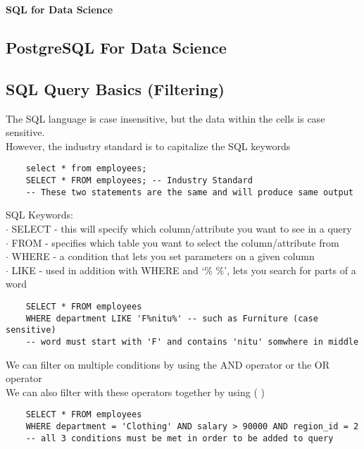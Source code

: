\documentclass[11pt, a4paper]{article}
\begin{document}
	\begin{titlepage}
		\begin{center} \Huge \textbf{SQL for Data Science} \end{center}
		\tableofcontents
		\newpage
	\end{titlepage}
	\begin{spacing}{1.1}
	\section{PostgreSQL For Data Science}
	\subsection{SQL Query Basics (Filtering)}
	The SQL language is case insensitive, but the data within the cells is case sensitive. \\
	However, the industry standard is to capitalize the SQL keywords
	\begin{lstlisting}
	select * from employees;
	SELECT * FROM employees; -- Industry Standard
	-- These two statements are the same and will produce same output \end{lstlisting} \vspace*{1mm}
	SQL Keywords: \\
	\hspace*{3mm} $\cdot$ SELECT - this will specify which column/attribute you want to see in a query \\
	\hspace*{3mm} $\cdot$ FROM - specifies which table you want to select the column/attribute from \\
	\hspace*{3mm} $\cdot$ WHERE - a condition that lets you set parameters on a given column \\
	\hspace*{3mm} $\cdot$ LIKE - used in addition with WHERE and `\% \%', lets you search for parts of a word
	\begin{lstlisting}
	SELECT * FROM employees
	WHERE department LIKE 'F%nitu%' -- such as Furniture (case sensitive)
	-- word must start with 'F' and contains 'nitu' somwhere in middle	\end{lstlisting} \vspace*{1mm}
	We can filter on multiple conditions by using the AND operator or the OR operator \\
	We can also filter with these operators together by using ( ) 
	\begin{lstlisting}
	SELECT * FROM employees
	WHERE department = 'Clothing' AND salary > 90000 AND region_id = 2
	-- all 3 conditions must be met in order to be added to query 
	

\end{lstlisting}
\end{spacing}
\end{document}
